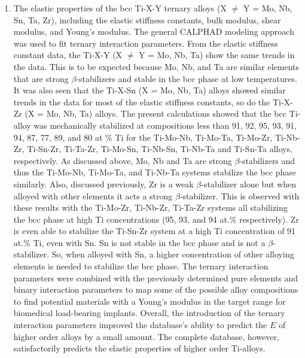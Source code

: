 \begin{enumerate}
	\item The elastic properties of the bcc Ti-X-Y ternary alloys (X $\neq$ Y = Mo, Nb, Sn, Ta, Zr), including the elastic stiffness constants, bulk modulus, shear modulus, and Young's modulus. The general CALPHAD modeling approach was used to fit ternary interaction parameters. From the elastic stiffness constant data, the Ti-X-Y (X $\neq$ Y = Mo, Nb, Ta) show the same trends in the data. This is to be expected because Mo, Nb, and Ta are similar elements that are strong $\beta$-stabilizers and stable in the bcc phase at low temperatures. It was also seen that the Ti-X-Sn (X = Mo, Nb, Ta) alloys showed similar trends in the data for most of the elastic stiffness constants, so do the Ti-X-Zr (X = Mo, Nb, Ta) alloys. The present calculations showed that the bcc Ti-alloy was mechanically stabilized at compositions less than 91, 92, 95, 93, 91, 94, 87, 77, 89, and 80 at \% Ti for the Ti-Mo-Nb, Ti-Mo-Ta, Ti-Mo-Zr, Ti-Nb-Zr, Ti-Sn-Zr, Ti-Ta-Zr, Ti-Mo-Sn, Ti-Nb-Sn, Ti-Nb-Ta and Ti-Sn-Ta alloys, respectively. As discussed above, Mo, Nb and Ta are strong $\beta$-stabilizers and thus the Ti-Mo-Nb, Ti-Mo-Ta, and Ti-Nb-Ta systems stabilize the bcc phase similarly. Also, discussed previously, Zr is a weak $\beta$-stabilizer alone but when alloyed with other elements it acts a strong $\beta$-stabilizer. This is observed with these results with the Ti-Mo-Zr, Ti-Nb-Zr, Ti-Ta-Zr systems all stabilizing the bcc phase at high Ti concentrations (95, 93, and 94 at.\% respectively). Zr is even able to stabilize the Ti-Sn-Zr system at a high Ti concentration of 91 at.\% Ti, even with Sn. Sn is not stable in the bcc phase and is not a $\beta$-stabilizer. So, when alloyed with Sn, a higher concentration of other alloying elements is needed to stabilize the bcc phase. The ternary interaction parameters were combined with the previously determined pure elements and binary interaction parameters to map some of the possible alloy compositions to find potential materials with a Young's modulus in the target range for biomedical load-bearing implants. Overall, the introduction of the ternary interaction parameters improved the database's ability to predict the $E$ of higher order alloys by a small amount. The complete database, however, satisfactorily predicts the elastic properties of higher order Ti-alloys.

\end{enumerate}
